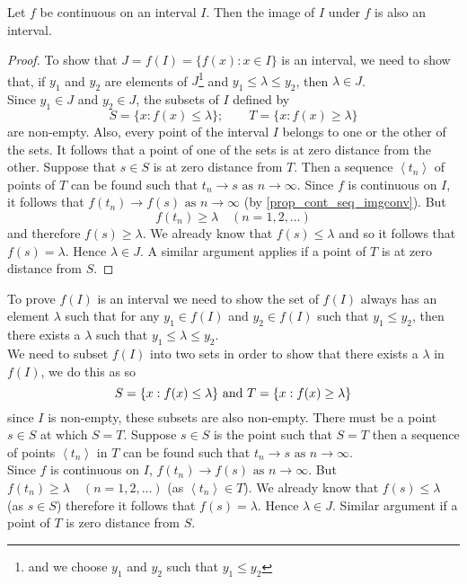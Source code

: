 \documentclass[10pt, a4paper]{article}
\newcommand{\limas}[3][n]{#2 \rightarrow #3 \text{ as } #1 \rightarrow \infty}
\newcommand{\seq}[1][x_n]{\left\langle #1 \right\rangle}
\begin{document}
\begin{theorem}\label{thm_cont_imgofcontfisinterval}
    Let $f$ be continuous on an interval $I$. Then the image of $I$ under $f$ is also an interval.
    \begin{proof}
        To show that $J = f(I) = \{f(x): x \in I\}$ is an interval, we need to show that, if $y_1$ and $y_2$ are elements of $J$\footnote{and we choose $y_1$ and $y_2$ such that $y_1 \leq y_2$} and $y_1 \leq \lambda \leq y_2$, then $\lambda \in J$. \\
        Since $y_1 \in J$ and $y_2 \in J$, the subsets of $I$ defined by
        $$S = \{x : f(x) \leq \lambda\};\qquad T = \{x : f(x) \geq \lambda\}$$
        are non-empty. Also, every point of the interval $I$ belongs to one or the other of the sets. It follows that a point of one of the sets is at zero distance from the other. Suppose that $s \in S$ is at zero distance from $T$. Then a sequence $\seq[t_n]$ of points of $T$ can be found such that $\limas{t_n}{s}$. Since $f$ is continuous on $I$, it follows that $\limas{f(t_n)}{f(s)}$ (by \autoref{prop_cont_seq_imgconv}). But
        $$f(t_n) \geq \lambda\quad(n = 1, 2, \dotsc)$$
        and therefore $f(s) \geq \lambda$. We already know that $f(s) \leq \lambda$ and so it follows that $f(s) = \lambda$. Hence $\lambda \in J$. A similar argument applies if a point of $T$ is at zero distance from $S$.
    \end{proof}
\end{theorem}
\begin{outline}
To prove $f(I)$ is an interval we need to show the set of $f(I)$ always has an element $\lambda$ such that for any $y_1 \in f(I)$ and $y_2 \in f(I)$ such that $y_1 \leq y_2$, then there exists a $\lambda$ such that $y_1 \leq \lambda \leq y_2$. \\
We need to subset $f(I)$ into two sets in order to show that there exists a $\lambda$ in $f(I)$, we do this as so
$$S = \{x : f(x) \leq \lambda\} \textnormal{ and } T = \{x : f(x) \geq \lambda\}$$
since $I$ is non-empty, these subsets are also non-empty. There must be a point $s \in S$ at which $S = T$. Suppose $s \in S$ is the point such that $S = T$ then a sequence of points $\seq[t_n]$ in $T$ can be found such that $\limas{t_n}{s}$. \\
Since $f$ is continuous on $I$, $\limas{f(t_n)}{f(s)}$. But $f(t_n) \geq \lambda \quad(n = 1, 2, \dotsc)$ (as $\seq[t_n] \in T$). We already know that $f(s) \leq \lambda$ (as $s \in S$) therefore it follows that $f(s) = \lambda$. Hence $\lambda \in J$. Similar argument if a point of $T$ is zero distance from $S$.
\end{outline}
\end{document}
